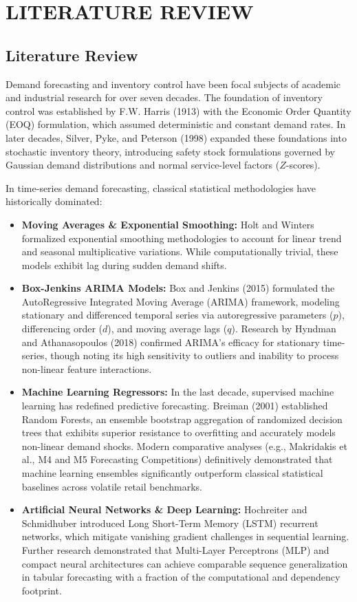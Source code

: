 \documentclass[12pt,a4paper]{report}
\begin{document}
\newpage
\chapter{LITERATURE REVIEW}

\section{Literature Review}
Demand forecasting and inventory control have been focal subjects of academic and industrial research for over seven decades. The foundation of inventory control was established by F.W. Harris (1913) with the Economic Order Quantity (EOQ) formulation, which assumed deterministic and constant demand rates. In later decades, Silver, Pyke, and Peterson (1998) expanded these foundations into stochastic inventory theory, introducing safety stock formulations governed by Gaussian demand distributions and normal service-level factors ($Z$-scores).

In time-series demand forecasting, classical statistical methodologies have historically dominated:
\begin{itemize}
    \item \textbf{Moving Averages \& Exponential Smoothing:} Holt and Winters formalized exponential smoothing methodologies to account for linear trend and seasonal multiplicative variations. While computationally trivial, these models exhibit lag during sudden demand shifts.
    \item \textbf{Box-Jenkins ARIMA Models:} Box and Jenkins (2015) formulated the AutoRegressive Integrated Moving Average (ARIMA) framework, modeling stationary and differenced temporal series via autoregressive parameters ($p$), differencing order ($d$), and moving average lags ($q$). Research by Hyndman and Athanasopoulos (2018) confirmed ARIMA's efficacy for stationary time-series, though noting its high sensitivity to outliers and inability to process non-linear feature interactions.
    \item \textbf{Machine Learning Regressors:} In the last decade, supervised machine learning has redefined predictive forecasting. Breiman (2001) established Random Forests, an ensemble bootstrap aggregation of randomized decision trees that exhibits superior resistance to overfitting and accurately models non-linear demand shocks. Modern comparative analyses (e.g., Makridakis et al., M4 and M5 Forecasting Competitions) definitively demonstrated that machine learning ensembles significantly outperform classical statistical baselines across volatile retail benchmarks.
    \item \textbf{Artificial Neural Networks \& Deep Learning:} Hochreiter and Schmidhuber introduced Long Short-Term Memory (LSTM) recurrent networks, which mitigate vanishing gradient challenges in sequential learning. Further research demonstrated that Multi-Layer Perceptrons (MLP) and compact neural architectures can achieve comparable sequence generalization in tabular forecasting with a fraction of the computational and dependency footprint.
\end{itemize}
\end{document}
